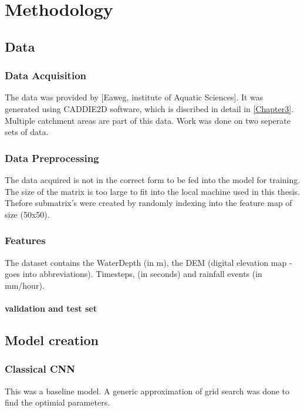 
\chapter{Methodology} %
\label{Chapter4} %

\section{Data}
\subsection{Data Acquisition}
The data was provided by [Eaweg, institute of Aquatic Sciences]. It was generated using CADDIE2D software, which is discribed in detail in \ref{Chapter3}. Multiple catchment areas are part of this data. Work was done on two seperate sets of data.

\subsection{Data Preprocessing}
The data acquired is not in the correct form to be fed into the model for training. The size of the matrix is too large to fit into the local machine used in this thesis. Thefore submatrix's were created by randomly indexing into the feature map of size (50x50).

\subsection{Features}
The dataset contains the WaterDepth (in m), the DEM (digital elevation map - goes into abbreviations). Timesteps, (in seconds) and rainfall events (in mm/hour).
\subsubsection{validation and test set}

\section{Model creation}
\subsection{Classical CNN}
This was a baseline model. A generic approximation of grid search was done to find the optimial parameters.
